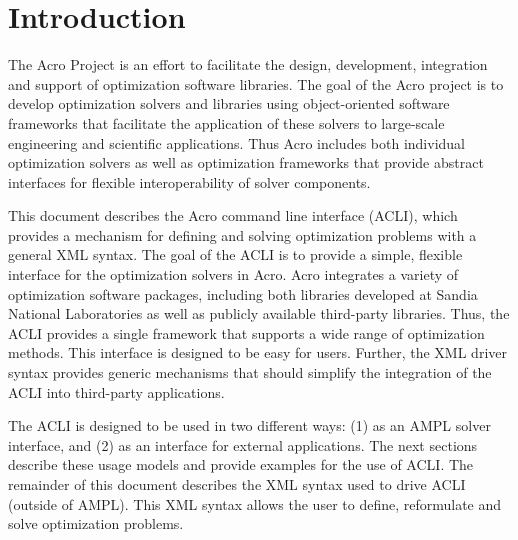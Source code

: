 \section{Introduction}

The Acro Project is an effort to facilitate the design, development, integration and support of optimization software libraries. The goal of the Acro project is to develop optimization solvers and libraries using object-oriented software frameworks that facilitate the application of these solvers to large-scale engineering and scientific applications. Thus Acro includes both individual optimization solvers as well as optimization frameworks that provide abstract interfaces for flexible interoperability of solver components.

This document describes the Acro command line interface (ACLI), which provides a mechanism for defining and solving optimization problems with a general XML syntax.  The goal of the ACLI is to provide a simple, flexible interface for the optimization solvers in Acro. Acro integrates a variety of optimization software packages, including both libraries developed at Sandia National Laboratories as well as publicly available third-party libraries. Thus, the ACLI provides a single framework that supports a wide range of optimization methods. This interface is designed to be easy for users.  Further, the XML driver syntax provides generic mechanisms that should simplify the integration of the ACLI into third-party applications.

The ACLI is designed to be used in two different ways: (1) as an AMPL solver interface, and (2) as an interface for external applications. The next sections describe these usage models and provide examples for the use of ACLI. The remainder of this document describes the XML syntax used to drive ACLI (outside of AMPL).  This XML syntax allows the user to define, reformulate and solve optimization problems.

